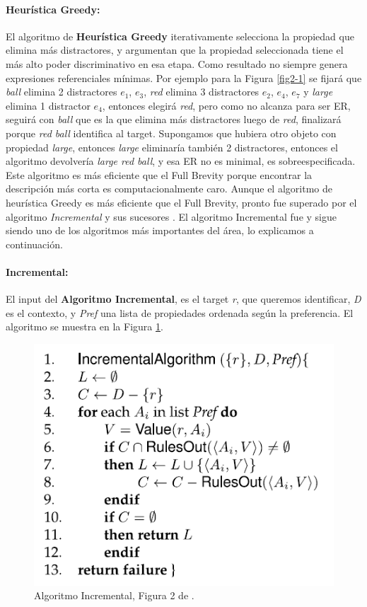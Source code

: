 \paragraph{Heur\'istica Greedy:} El algoritmo de {\bf Heur\'istica Greedy} \cite{greedy} iterativamente selecciona la propiedad que elimina m\'as distractores, y argumentan que la propiedad seleccionada tiene el m\'as alto poder discriminativo en esa etapa. Como resultado 
no siempre genera expresiones referenciales m\'inimas. Por ejemplo para la Figura \ref{fig2-1} se fijar\'a que {\it ball} elimina 2 distractores {$e_{1}$, $e_{3}$}, 
{\it red} elimina 3 distractores {$e_{2}$, $e_{4}$, $e_{7}$} y {\it large} elimina 1 distractor {$e_{4}$}, entonces elegir\'a {\it red}, 
pero como no alcanza para ser ER, seguir\'a con {\it ball} que es la que elimina m\'as distractores luego de {\it red}, finalizar\'a porque 
{\it red ball} identifica al target. Supongamos que hubiera otro objeto con propiedad {\it large}, entonces {\it large} eliminar\'ia tambi\'en  
 2 distractores, entonces el algoritmo devolver\'ia {\it large red ball}, y esa ER no es minimal, es sobreespecificada.
Este algoritmo es m\'as eficiente que el Full Brevity porque encontrar la descripci\'on m\'as corta es computacionalmente caro. Aunque el 
algoritmo de heur\'istica Greedy es m\'as eficiente que el Full Brevity, pronto fue superado por el algoritmo {\it Incremental} 
y sus sucesores \cite{C92-1038,incremental}. El algoritmo Incremental fue y sigue siendo uno de los algoritmos 
m\'as importantes del \'area, lo explicamos a continuaci\'on. 

\paragraph{Incremental:}
\label{sec:algo_incremental} 

El input del {\bf Algoritmo Incremental}, es el target \emph{r}, que queremos identificar, \emph{D} es el contexto, y \emph{Pref} una lista de propiedades ordenada seg\'un la preferencia. El algoritmo se muestra en la Figura \ref{algoritmoIncremental}.
\medskip
\begin{figure}[H]
\includegraphics[width=.5\textwidth]{images/algoritmoIncremental.png}
\caption{Algoritmo Incremental, Figura 2 de \protect\cite{survey}.}\label{algoritmoIncremental}

\end{figure}

